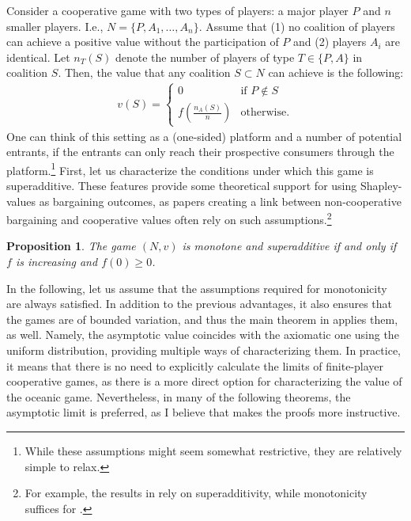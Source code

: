 \documentclass[a4paper]{article}
\newtheorem{proposition}{Proposition}
\begin{document}
Consider a cooperative game with two types of players: a major player $P$ and $n$ smaller players. I.e., $N = \{P, A_1, \dots, A_n\}$. Assume that (1) no coalition of players can achieve a positive value without the participation of $P$ and (2) players $A_i$ are identical. Let $n_T(S)$ denote the number of players of type $T \in \{P, A\}$ in coalition $S$. Then, the value that any coalition $S \subset N$ can achieve is the following:
\begin{align*}
    v(S) = \begin{cases}
        0                              & \text{if } P \notin S \\
        f\left(\frac{n_A(S)}{n}\right) & \text{otherwise}.
    \end{cases}
\end{align*}
One can think of this setting as a (one-sided) platform and a number of potential entrants, if the entrants can only reach their prospective consumers through the platform.\footnote{While these assumptions might seem somewhat restrictive, they are relatively simple to relax.} First, let us characterize the conditions under which this game is superadditive. These features provide some theoretical support for using Shapley-values as bargaining outcomes, as papers creating a link between non-cooperative bargaining and cooperative values often rely on such assumptions.\footnote{For example, the results in \textcite{gul1989bargaining} rely on superadditivity, while monotonicity suffices for \textcite[]{hart1996bargaining}.}

\begin{proposition}
    \label{prop:monotone}
    The game $(N, v)$ is monotone and superadditive if and only if $f$ is increasing and $f(0) \geq 0$. %
\end{proposition}

In the following, let us assume that the assumptions required for monotonicity are always satisfied. In addition to the previous advantages, it also ensures that the games are of bounded variation, and thus the main theorem in \textcite{fogelman1980asymptotic} applies them, as well. Namely, the asymptotic value coincides with the axiomatic one using the uniform distribution, providing multiple ways of characterizing them. In practice, it means that there is no need to explicitly calculate the limits of finite-player cooperative games, as there is a more direct option for characterizing the value of the oceanic game. Nevertheless, in many of the following theorems, the asymptotic limit is preferred, as I believe that makes the proofs more instructive.
\end{document}

